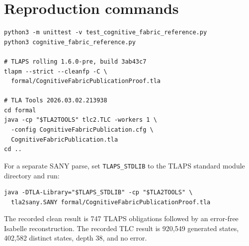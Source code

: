 \documentclass[11pt]{article}
\theoremstyle{definition}
\theoremstyle{plain}
\begin{document}
\section{Reproduction commands}

\begin{lstlisting}[style=fabric]
python3 -m unittest -v test_cognitive_fabric_reference.py
python3 cognitive_fabric_reference.py

# TLAPS rolling 1.6.0-pre, build 3ab43c7
tlapm --strict --cleanfp -C \
  formal/CognitiveFabricPublicationProof.tla

# TLA Tools 2026.03.02.213938
cd formal
java -cp "$TLA2TOOLS" tlc2.TLC -workers 1 \
  -config CognitiveFabricPublication.cfg \
  CognitiveFabricPublication.tla
cd ..
\end{lstlisting}

For a separate SANY parse, set \texttt{TLAPS\_STDLIB} to the TLAPS standard
module directory and run:
\begin{lstlisting}[style=fabric]
java -DTLA-Library="$TLAPS_STDLIB" -cp "$TLA2TOOLS" \
  tla2sany.SANY formal/CognitiveFabricPublicationProof.tla
\end{lstlisting}
The recorded clean result is 747 TLAPS obligations followed by an
error-free Isabelle reconstruction.  The recorded TLC result is 920,549
generated states, 402,582 distinct states, depth 38, and no error.
\end{document}
